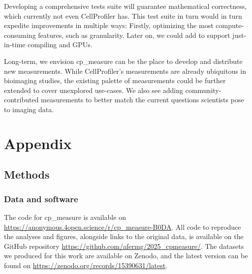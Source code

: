 \documentclass{article}
\begin{document}
Developing a comprehensive tests suite will guarantee mathematical correctness, which currently not even CellProfiler has. This test suite in turn would in turn expedite improvements in multiple ways: Firstly, optimizing the most compute-consuming features, such as granularity. Later on, we could add to support just-in-time compiling and GPUs.

Long-term, we envision cp\_measure can be the place to develop and distribute new measurements. While CellProfiler's measurements are already ubiquitous in bioimaging studies, the existing palette of measurements could be further extended to cover unexplored use-cases. We also see adding community-contributed measurements to better match the current questions scientists pose to imaging data.



\section{Appendix}
\label{sec:orgdd18dd8}
\subsection{Methods}
\label{sec:orgb3e9382}
\subsubsection{Data and software}
\label{sec:orgbda0ae2}
The code for cp\_measure is available on \url{https://anonymous.4open.science/r/cp\_measure-B0DA}. All code to reproduce the analyses and figures, alongside links to the original data, is available on the GitHub repository \url{https://github.com/afermg/2025\_cpmeasure/}. The datasets we produced for this work are available on Zenodo, and the latest version can be found on \url{https://zenodo.org/records/15390631/latest}.
\end{document}
